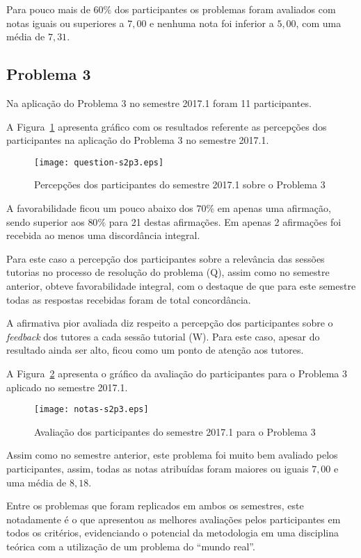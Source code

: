 Para pouco mais de $60\%$ dos participantes os problemas foram
avaliados com notas iguais ou superiores a $7,00$ e nenhuma nota
foi inferior a $5,00$, com uma média de $7,31$.

\subsection{Problema 3}
Na aplicação do Problema 3 no semestre 2017.1 foram 11 participantes.

A Figura~\ref{percep-s2p3} apresenta gráfico com os resultados referente
as percepções dos participantes na aplicação do
Problema 3 no semestre 2017.1.

\begin{figure}[!htb]
\centering
\texttt{[image: question-s2p3.eps]}
\caption{Percepções dos participantes do semestre 2017.1 sobre o Problema 3}
\label{percep-s2p3}
\end{figure}

A favorabilidade ficou um pouco abaixo dos $70\%$ em apenas uma afirmação,
sendo superior aos $80\%$ para 21 destas afirmações.
Em apenas 2 afirmações foi recebida ao menos uma discordância integral.

Para este caso a percepção dos participantes
sobre a relevância das sessões tutorias no processo
de resolução do problema (Q), assim como no semestre
anterior, obteve favorabilidade integral, com o destaque de
que para este semestre todas as respostas recebidas foram de
total concordância.

A afirmativa pior avaliada diz respeito a percepção dos participantes
sobre o \textit{feedback} dos tutores a cada sessão tutorial (W).
Para este caso, apesar do resultado ainda ser alto, ficou como
um ponto de atenção aos tutores.

A Figura~\ref{aval-s2p3} apresenta o gráfico da
avaliação do participantes para o Problema 3 aplicado no semestre 2017.1.

\begin{figure}[!htb]
\centering
\texttt{[image: notas-s2p3.eps]}
\caption{Avaliação dos participantes do semestre 2017.1 para o Problema 3}
\label{aval-s2p3}
\end{figure}

Assim como no semestre anterior, este problema foi muito bem avaliado
pelos participantes, assim, todas as notas atribuídas foram maiores
ou iguais $7,00$ e uma média de $8,18$.

Entre os problemas que foram replicados em ambos os semestres, este
notadamente é o que apresentou as melhores avaliações pelos participantes
em todos os critérios, evidenciando o potencial da metodologia em uma
disciplina teórica com a utilização de um problema do ``mundo real''.

